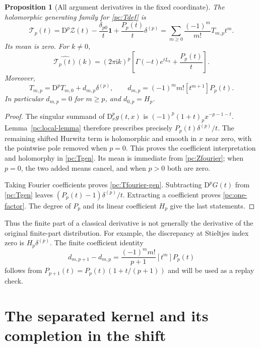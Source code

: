 \documentclass[11pt,a4paper]{article}
\numberwithin{equation}{section}
\newtheorem{proposition}[theorem]{Proposition}
\theoremstyle{definition}
\newcommand{\ii}{\mathrm i}
\newcommand{\D}{\mathrm D}
\newcommand{\CZ}{\mathscr Z}
\newcommand{\TG}{\mathcal T}
\newcommand{\one}{\mathbf 1}
\begin{document}
\begin{proposition}[All argument derivatives in the fixed coordinate]\label{pc:Tp}
The holomorphic generating family for \eqref{pc:Tdef} is
\begin{equation}\label{pc:Tgen}
\TG_p(t)=\D^p\CZ(t)-\frac{\delta_{p0}}t\one
+\frac{P_p(t)}t\delta^{(p)}
=\sum_{m\ge0}\frac{(-1)^m}{m!}T_{m,p}t^m.
\end{equation}
Its mean is zero. For $k\ne0$,
\begin{equation}\label{pc:Tfourier-gen}
\widehat{\TG_p(t)}(k)=(2\pi\ii k)^p
\left[\Gamma(-t)e^{tL_k}+\frac{P_p(t)}t\right].
\end{equation}
Moreover,
\begin{equation}\label{pc:one-factor}
T_{m,p}=\D^pT_{m,0}+d_{m,p}\delta^{(p)},\qquad
d_{m,p}=(-1)^m m![t^{m+1}]P_p(t).
\end{equation}
In particular $d_{m,p}=0$ for $m\ge p$, and $d_{0,p}=H_p$.
\end{proposition}
\begin{proof}
The singular summand of $\D_x^pg(t,x)$ is
$(-1)^p(1+t)_p x^{-p-1-t}$. Lemma~\ref{pc:local-lemma} therefore prescribes precisely $P_p(t)\delta^{(p)}/t$. The remaining shifted Hurwitz term is holomorphic and smooth in $x$ near zero, with the pointwise pole removed when $p=0$. This proves the coefficient interpretation and holomorphy in \eqref{pc:Tgen}. Its mean is immediate from \eqref{pc:Zfourier}; when $p=0$, the two added means cancel, and when $p>0$ both are zero.

Taking Fourier coefficients proves \eqref{pc:Tfourier-gen}. Subtracting $\D^pG(t)$ from \eqref{pc:Tgen} leaves $(P_p(t)-1)\delta^{(p)}/t$. Extracting a coefficient proves \eqref{pc:one-factor}. The degree of $P_p$ and its linear coefficient $H_p$ give the last statements.
\end{proof}
Thus the finite part of a classical derivative is not generally the derivative of the original finite-part distribution. For example, the discrepancy at Stieltjes index zero is $H_p\delta^{(p)}$. The finite coefficient identity
\begin{equation}\label{pc:d-increment}
d_{m,p+1}-d_{m,p}=\frac{(-1)^m m!}{p+1}[t^m]P_p(t)
\end{equation}
follows from $P_{p+1}(t)=P_p(t)(1+t/(p+1))$ and will be used as a replay check.

\section{The separated kernel and its completion in the shift}\label{pc:separated}
\end{document}
